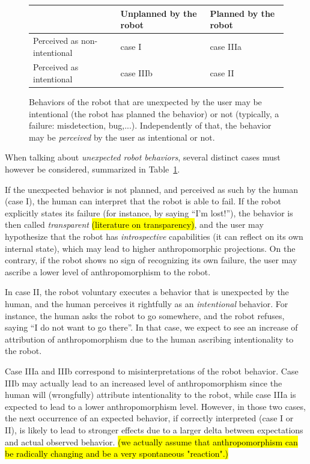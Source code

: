 \documentclass{frontiersSCNS} %
\begin{document}
\begin{figure}\footnotesize
    \centering
    \begin{tabular}{  >{\centering\arraybackslash}m{2cm} | >{\centering\arraybackslash}m{2cm} | >{\centering\arraybackslash}m{2cm} }
     & Unplanned by the robot & Planned by the robot \\ \hline
    Perceived as non-intentional & case I  & case IIIa  \\ \hline
    Perceived as intentional &  case IIIb & case II 
    \end{tabular}
\caption{
    Behaviors of the robot that are unexpected by the user may be intentional
    (the robot has planned the behavior) or not (typically, a failure:
    misdetection, bug,...). Independently of that, the behavior may be
    \emph{perceived} by the user as intentional or not.}
\label{fig:perceptionUnexpectedBehavior}
\end{figure}

When talking about \emph{unexpected robot behaviors}, several distinct cases
must however be considered, summarized in
Table~\ref{fig:perceptionUnexpectedBehavior}.

If the unexpected behavior is not planned, and perceived as such by the human
(case I), the human can interpret that the robot is able to fail. If the robot
explicitly states its failure (for instance, by saying ``I'm lost!''), the
behavior is then called \emph{transparent} 
\hl{(literature on transparency)}, and the user may hypothesize that the
robot has \emph{introspective} capabilities (it can reflect on its own internal
state), which may lead to higher anthropomorphic projections.  On the
contrary, if the robot shows no sign of recognizing its own failure, the user
may ascribe a lower level of anthropomorphism to the robot.

In case II, the robot voluntary executes a behavior that is unexpected by the
human, and the human perceives it rightfully as an \emph{intentional} behavior.
For instance, the human asks the robot to go somewhere, and the robot refuses,
saying ``I do not want to go there''. In that case, we expect to see an increase
of attribution of anthropomorphism due to the human ascribing intentionality to the
robot.

Case IIIa and IIIb correspond to misinterpretations of the robot behavior. Case
IIIb may actually lead to an increased level of anthropomorphism since the human
will (wrongfully) attribute intentionality to the robot, while case IIIa is
expected to lead to a lower anthropomorphism level.  However, in those two
cases, the next occurrence of an expected behavior, if correctly interpreted
(case I or II), is likely to lead to stronger effects due to a larger delta
between expectations and actual observed behavior. \hl{(we actually assume that
anthropomorphism can be radically changing and be a very spontaneous
"reaction".)}
\end{document}
